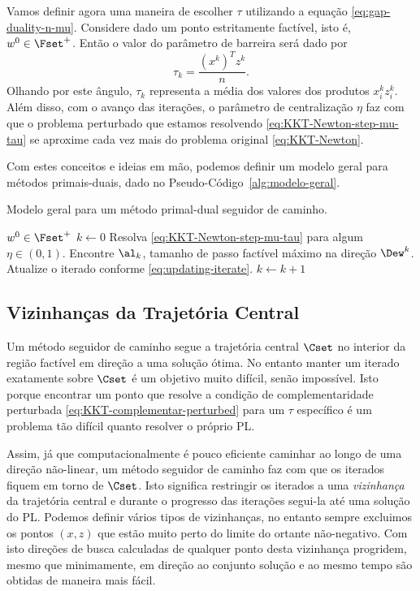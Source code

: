 Vamos definir agora uma maneira de escolher $\tau$ utilizando a equação
\eqref{eq:gap-duality-n-mu}. Considere  dado  um ponto estritamente
factível, isto é, $w^0\in \Fset^+$. Então o valor do parâmetro de
barreira  será dado por 
\begin{equation}
\label{eq:tau_k}
\tau_k = \frac{(x^k)^Tz^k}{n}. 
\end{equation}
Olhando por este ângulo, $\tau_k$ representa a média dos valores dos produtos
$x_i^k z_i^k$. Além disso, com o avanço das iterações, o parâmetro de
centralização $\eta$ faz com  que o problema perturbado que estamos resolvendo
\eqref{eq:KKT-Newton-step-mu-tau} se aproxime cada vez mais do problema original \eqref{eq:KKT-Newton}.

 

Com estes conceitos e ideias em  mão, podemos definir um modelo geral para
métodos primais-duais, dado no Pseudo-Código~\ref{alg:modelo-geral}.
\begin{algorithm}
\caption{Modelo geral para um método primal-dual seguidor de caminho.}
\label{alg:modelo-geral}
\begin{algorithmic}[0] 
\Require  $w^0\in\Fset^+$ 
\State $k\gets 0$
	\Repeat
		\State Resolva \eqref{eq:KKT-Newton-step-mu-tau}  para algum $\eta\in(0,1)$.
		\State Encontre $\al_k$, tamanho de passo factível máximo  na direção $\Dew^k$.
		\State Atualize o iterado conforme \eqref{eq:updating-iterate}.
		\State $k\gets k+1$
\end{algorithmic}
\end{algorithm}



\subsection{Vizinhanças da Trajetória Central}
\label{subsec:neighbouhoods}

Um método seguidor de caminho segue  a trajetória central $\Cset$ no interior
da região factível em direção a uma solução ótima. No entanto manter um
iterado exatamente sobre $\Cset$ é um objetivo muito difícil, senão impossível.
Isto porque encontrar um ponto que resolve a condição de complementaridade
perturbada \eqref{eq:KKT-complementar-perturbed} para um $\tau$ específico é um
problema tão difícil quanto resolver o próprio \ac{PL}.


Assim, já que computacionalmente é pouco eficiente caminhar ao longo de uma
direção não-linear, um método seguidor de caminho faz com que os iterados
fiquem em torno de $\Cset$. Isto significa restringir os iterados a uma
\emph{vizinhança} da trajetória central e durante o progresso das iterações
segui-la até uma solução do \ac{PL}. Podemos definir vários tipos de
vizinhanças, no entanto sempre excluimos os pontos $(x,z)$ que estão muito perto
do limite do ortante não-negativo. Com isto  direções de busca calculadas de
qualquer ponto desta vizinhança progridem, mesmo que minimamente, em direção ao
conjunto solução e ao mesmo tempo são obtidas de maneira mais fácil.

